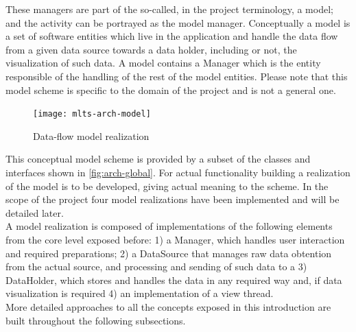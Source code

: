 
		These managers are part of the so-called, in the project terminology, a model; and the activity can be portrayed as the model manager. Conceptually a model is a set of software entities which live in the application and handle the data flow from a given data source towards a data holder, including or not, the visualization of such data. A model contains a Manager which is the entity responsible of the handling of the rest of the model entities. Please note that this model scheme is  specific to the domain of the project and is not a general one.

		\begin{figure}[h]
		\texttt{[image: mlts-arch-model]}
		\centering
		\caption{Data-flow model realization}
		\label{fig:arch-model}
		\end{figure}

		This conceptual model  scheme is provided by a subset of the classes and interfaces shown in \autoref{fig:arch-global}. For actual functionality building a realization of the model is to be developed, giving actual meaning to the scheme. In the scope of the project four model realizations have been implemented and will be detailed later.\\

		A model realization is composed of implementations of the following elements from the core level exposed before: 1) a Manager, which handles user interaction and required preparations; 2) a DataSource that manages raw data obtention from the actual source, and processing and sending of such data to a 3) DataHolder, which stores and handles the data in any required way and, if data visualization is required 4) an implementation of a view thread.\\

		More detailed approaches to all the concepts exposed in this introduction are built throughout the following subsections.

